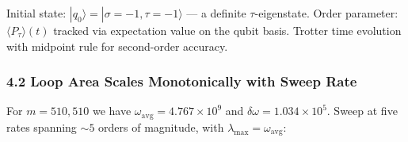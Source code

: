 \documentclass[
]{article}
\begin{document}
Initial state: \(|q_0\rangle = |\sigma{=}{-}1, \tau{=}{-}1\rangle\) ---
a definite \(\tau\)-eigenstate. Order parameter:
\(\langle P_\tau \rangle(t)\) tracked via expectation value on the qubit
basis. Trotter time evolution with midpoint rule for second-order
accuracy.

\subsubsection{4.2 Loop Area Scales Monotonically with Sweep
Rate}\label{loop-area-scales-monotonically-with-sweep-rate}

For \(m = 510{,}510\) we have \(\omega_\text{avg} = 4.767 \times 10^9\)
and \(\delta\omega = 1.034 \times 10^5\). Sweep at five rates spanning
\(\sim 5\) orders of magnitude, with
\(\lambda_\text{max} = \omega_\text{avg}\):
\end{document}
